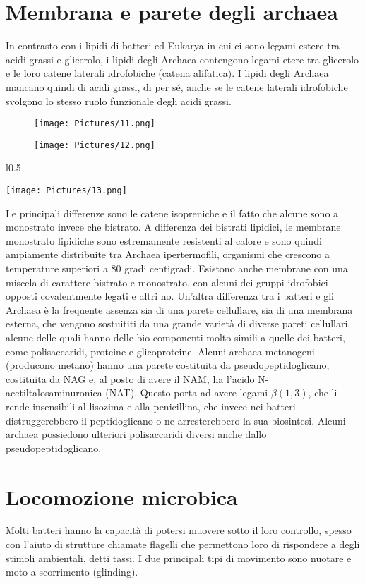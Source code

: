 \section{Membrana e parete degli archaea}
In contrasto con i lipidi di batteri ed Eukarya in cui ci sono legami estere tra acidi grassi e glicerolo, i lipidi degli Archaea contengono legami etere 
tra glicerolo e le loro catene laterali idrofobiche (catena alifatica). I lipidi degli Archaea mancano quindi di acidi grassi, di per sé, anche se le catene 
laterali idrofobiche svolgono lo stesso ruolo funzionale degli acidi grassi. 
\begin{figure}[H]
	\texttt{[image: Pictures/11.png]}
\end{figure}
\begin{figure}[H]
	\texttt{[image: Pictures/12.png]}
\end{figure}
\begin{wrapfigure}{l}{0.5\textwidth}
  \begin{center}
    \texttt{[image: Pictures/13.png]}
  \end{center}
\end{wrapfigure}
Le principali differenze sono le catene isopreniche e il fatto che alcune sono 
a monostrato invece che bistrato. A differenza dei bistrati lipidici, le membrane monostrato lipidiche sono estremamente resistenti al calore e sono quindi 
ampiamente distribuite tra Archaea ipertermofili, organismi che crescono a temperature superiori a 80 gradi centigradi. Esistono anche membrane con una 
miscela di carattere bistrato e monostrato, con alcuni dei gruppi idrofobici opposti covalentmente legati e altri no. Un’altra differenza tra i batteri e 
gli Archaea è la frequente assenza sia di una parete cellullare, sia di una membrana esterna, che vengono sostuititi da una grande varietà di diverse pareti 
cellullari, alcune delle quali hanno delle bio-componenti molto simili a quelle dei batteri, come polisaccaridi, proteine e glicoproteine. Alcuni archaea 
metanogeni (producono metano) hanno una parete costituita da pseudopeptidoglicano, costituita da NAG e, al posto di avere il NAM, ha 
l’acido N-acetiltalosaminuronica (NAT). Questo porta ad avere legami $\beta(1, 3)$, che li rende insensibili al lisozima e 
alla penicillina, che invece nei batteri distruggerebbero il peptidoglicano o ne arresterebbero la sua biosintesi. Alcuni archaea possiedono ulteriori polisaccaridi diversi anche dallo pseudopeptidoglicano.
\section{Locomozione microbica}
Molti batteri hanno la capacità di potersi muovere sotto il loro controllo, spesso con l’aiuto di strutture chiamate flagelli che 
permettono loro di rispondere a degli stimoli ambientali, detti tassi. I due principali tipi di movimento sono nuotare e moto a 
scorrimento (glinding). 
